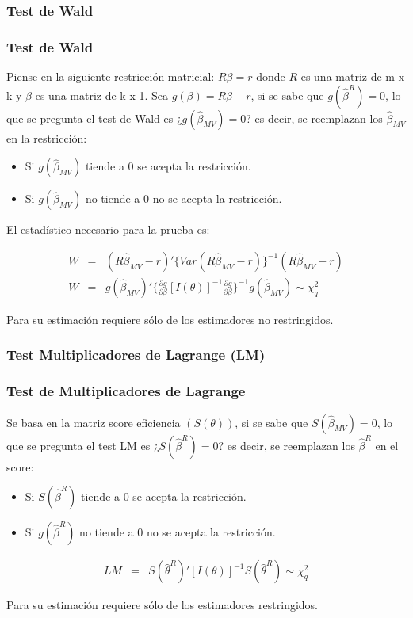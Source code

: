 \subsubsection{Test de Wald}

\begin{frame}
	\frametitle{Test de Wald}
	
	Piense en la siguiente restricción matricial: $R\beta=r$ donde $R$
	es una matriz de m x k y $\beta$ es una matriz de k x 1. Sea
	$g(\beta)=R\beta-r$, si se sabe que $g(\hat\beta^R)=0$, lo que se
	pregunta el test de Wald es ¿$g(\hat\beta_{MV})=0$? es decir, se
	reemplazan los $\hat\beta_{MV}$ en la restricción:
	
	\begin{itemize}
		\item Si $g(\hat\beta_{MV})$ tiende a $0$ se acepta la
		restricción.
		\item Si $g(\hat\beta_{MV})$ no tiende a $0$ no se acepta la
		restricción.
	\end{itemize}
	
	El estadístico necesario para la prueba es:
	
	\begin{eqnarray*}
		W &=& (R\hat\beta_{MV}-r)'\{ Var (R\hat\beta_{MV}-r) \}^{-1} (R\hat\beta_{MV}-r) \\
		W &=& g(\hat\beta_{MV})'\{ \frac{\partial g}{\partial \beta} [I(\theta)]^{-1}  \frac{\partial g}{\partial \beta} \}^{-1} g(\hat\beta_{MV}) \sim \chi^2_q
	\end{eqnarray*}
	
	Para su estimación requiere sólo de los estimadores no
	restringidos.
	
\end{frame}

\subsubsection{Test Multiplicadores de Lagrange (LM)}

\begin{frame}
	\frametitle{Test de Multiplicadores de Lagrange}
	
	Se basa en la matriz score eficiencia $(S(\theta))$, si se sabe
	que $S(\hat\beta_{MV})=0$, lo que se pregunta el test LM es
	¿$S(\hat\beta^R)=0$? es decir, se reemplazan los $\hat\beta^R$ en
	el score:
	
	\begin{itemize}
		\item Si $S(\hat\beta^R)$ tiende a $0$ se acepta la
		restricción.
		\item Si $g(\hat\beta^R)$ no tiende a $0$ no se acepta la
		restricción.
	\end{itemize}
	
	\begin{eqnarray*}
		LM &=& S(\hat\theta^R)'[I(\theta)]^{-1} S(\hat\theta^R) \sim \chi^2_q
	\end{eqnarray*}
	
	Para su estimación requiere sólo de los estimadores restringidos.
\end{frame}

